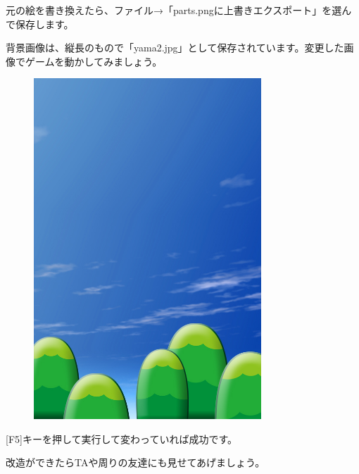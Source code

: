元の絵を書き換えたら、ファイル→「parts.pngに上書きエクスポート」を選んで保存します。

背景画像は、縦長のもので「yama2.jpg」として保存されています。変更した画像でゲームを動かしてみましょう。


\begin{figure}[H]
    \begin{center}
      \includegraphics[keepaspectratio,width=8.546cm,height=12.804cm]{text04-img/text04-img032.jpg}
    \end{center}
    \label{fig:prog_menu}
\end{figure}

[F5]キーを押して実行して変わっていれば成功です。

改造ができたらTAや周りの友達にも見せてあげましょう。

